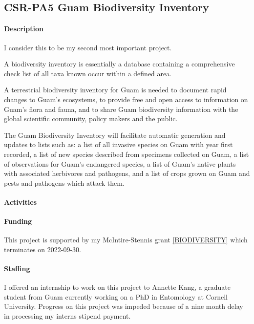 \subsection{CSR-PA5 Guam Biodiversity Inventory}
\begin{refsection}
	
	\paragraph{Description}
	
	I consider this to be my second most important project.
	
	A biodiversity inventory is essentially a database containing a comprehensive
	check list of all taxa known occur within a defined area.
	
	A terrestrial biodiversity inventory for Guam is needed to document
	rapid changes to Guam's ecosystems, to provide free
	and open access to information on Guam's flora and
	fauna, and to share Guam biodiversity information with the global
	scientific community, policy makers and the public.
	
	The Guam Biodiversity Inventory will facilitate automatic generation
	and updates to lists such as: a list of all invasive species on Guam
	with year first recorded, a list of new species described from specimens
	collected on Guam, a list of observations for Guam's
	endangered species, a list of Guam's native plants
	with associated herbivores and pathogens, and a list of crops grown
	on Guam and pests and pathogens which attack them.
	
	\paragraph{Activities}
	
	\paragraph{Funding} This project is supported by my McIntire-Stennis grant \ref{BIODIVERSITY} which terminates on 2022-09-30.
	
	\paragraph{Staffing} I offered an internship to work on this project to Annette Kang, a graduate student from Guam currently working on a PhD in Entomology at Cornell University. Progress on this project was impeded because of a nine month delay in processing my interns stipend payment.  	
	

\end{refsection}
